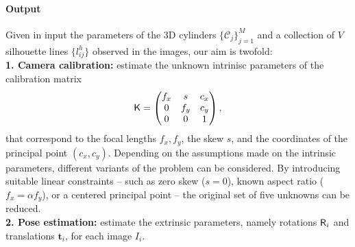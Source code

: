\paragraph{Output}
Given in input the parameters of the 3D cylinders $\{\mathcal{C}_j\}_{j=1}^M$ and a collection of $V$ silhouette lines $\{l^h_{ij}\}$ observed in the images, our aim is  twofold:\\
\textbf{1. Camera calibration:} estimate the unknown intrinisc parameters of the calibration matrix
\begin{equation}
\mathsf{K}=\begin{pmatrix}f_x & s &c_x\\ 0 & f_y & c_y \\ 0 & 0 & 1 \end{pmatrix},
\end{equation}
that correspond to  the focal lengths $f_x, f_y$, the skew $s$, and the coordinates of the principal point $(c_x, c_y)$.
Depending on the assumptions made on the intrinsic parameters, different variants of the problem can be considered. By introducing suitable linear constraints -- such as zero skew ($s = 0$), known aspect ratio ($f_x = \alpha f_y$), or a centered principal point -- the original set of five unknowns can be reduced. \\
\textbf{2. Pose estimation:} estimate the extrinsic parameters, namely rotations $\mathsf{R}_i$ and translations $\mathbf{t}_i$, for each image $I_i$.


